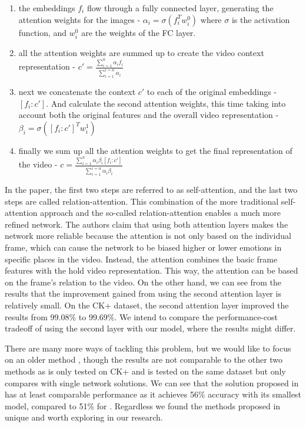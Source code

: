\documentclass[../main.tex]{subfiles}
\begin{document}
\begin{enumerate}[i]
    \item the embeddings $f_i$ flow through a fully connected layer, generating the attention weights for the images - $\alpha_i = \sigma(f_i^Tw_i^0)$
        where $\sigma$ is the activation function, and $w_i^0$ are the weights of the FC layer.
    \item all the attention weights are summed up to create the video context representation - $c'=\frac{\sum_{i=1}^{n}\alpha_if_i}{\sum_{i=1}^{i=n}\alpha_i}$
    \item next we concatenate the context $c'$ to each of the original embeddings - $[f_i:c']$. And calculate the second attention weights, this time 
        taking into account both the original features and the overall video representation - $\beta_i = \sigma([f_i:c']^Tw_i^1)$
    \item finally we sum up all the attention weights to get the final representation of the video - 
    $c = \frac{\sum_{i=1}^{n}\alpha_i\beta_i[f_i:c']}{\sum_{i=1}^{i=n}\alpha_i\beta_i}$
\end{enumerate}

In the paper, the first two steps are referred to as self-attention, and the last two steps are called relation-attention.
This combination of the more traditional self-attention approach and the so-called relation-attention enables a much more refined network.
The authors claim that using both attention layers makes the network more reliable because the attention is not only based on the individual frame,
which can cause the network to be biased higher or lower emotions in specific places in the video. Instead, the attention combines the basic frame
features with the hold video representation. This way, the attention can be based on the frame's relation to the video.
On the other hand, we can see from the results that the improvement gained from using the second attention layer is relatively small. On the CK+ dataset,
the second attention layer improved the results from 99.08\% to 99.69\%. We intend to compare the performance-cost tradeoff of
using the second layer with our model, where the results might differ.
\par

There are many more ways of tackling this problem, but we would like to focus on an older method \cite{c3d},
though the results are not comparable to the other two methods as \cite{emotionnet-nano} is only tested on CK+ and \cite{fan}
is tested on the same dataset but only compares with single network solutions. We can see that the solution proposed in \cite{c3d}
has at least comparable performance as it achieves 56\% accuracy with its smallest model, compared to 51\% for \cite{fan}.
Regardless we found the methods proposed in \cite{c3d} unique and worth exploring in our research.
\par
\end{document}
